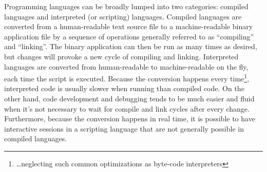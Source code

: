 Programming languages can be broadly lumped into two categories:
compiled languages and interpreted (or scripting) languages.  Compiled
languages are converted from a human-readable text source file to a
machine-readable binary application file by a sequence of operations
generally referred to as ``compiling'' and ``linking''.  The binary
application can then be run as many times as desired, but changes will
provoke a new cycle of compiling and linking.  Interpreted languages
are converted from human-readable to machine-readable on the fly, each
time the script is executed.  Because the conversion happens every
time\footnote{\ldots neglecting such common optimizations as byte-code
interpreters}, interpreted code is usually slower when running than
compiled code.  On the other hand, code development and debugging
tends to be much easier and fluid when it's not necessary to wait for
compile and link cycles after every change.  Furthermore, because the
conversion happens in real time, it is possible to have interactive
sessions in a scripting language that are not generally possible in
compiled languages.

